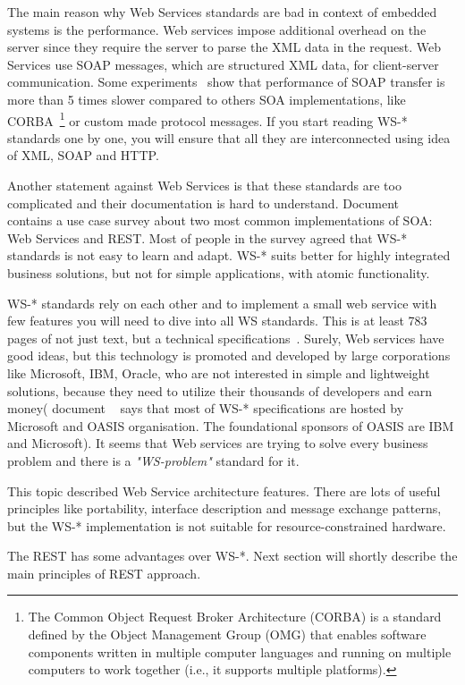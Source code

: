 The main reason why Web Services standards are bad in context of embedded
systems is the performance.
Web services impose additional overhead on the server since they require the
server to parse the \gls{XML} data in the request. Web Services use \gls{SOAP}
messages, which are structured \gls{XML} data, for client-server communication.
Some experiments~\cite{1182978, 5470528} show that performance of SOAP transfer
is more than 5 times slower compared to others \gls{SOA} implementations, like
CORBA~\footnote{The Common Object Request Broker Architecture (CORBA) is a
standard defined by the Object Management Group (OMG) that enables software
components written in multiple computer languages and running on multiple
computers to work together (i.e., it supports multiple
platforms).\cite{wikipedia:CORBA}} or custom made protocol messages. If you
start reading WS-* standards one by one, you will ensure that all they are
interconnected using idea of \gls{XML}, \gls{SOAP} and \gls{HTTP}. 


Another statement against Web Services is that these standards are too
complicated and their documentation is hard to
understand. Document ~\cite{dguinard-rest-vs-ws} contains a use case survey
about two most common implementations of SOA: Web Services and \gls{REST}. Most of people
in the survey agreed that WS-* standards is not easy to learn and adapt. WS-*
suits better for highly integrated business solutions, but not for simple
applications, with atomic functionality.

WS-* standards rely on each other and to implement a small web service with
few features you will need to dive into all WS standards. This is at least 783
pages of not just text, but a technical specifications~\cite{ws_pagecount}.
Surely, Web services have good ideas, but this technology is promoted and
developed by large corporations like Microsoft, IBM, Oracle, who are not
interested in simple and lightweight solutions, because they need to utilize
their thousands of developers and earn money( document ~\cite{ws_pagecount} says
that most of WS-* specifications are hosted by Microsoft and  OASIS
organisation. The foundational sponsors of OASIS are IBM and Microsoft).
It seems that Web services are trying to solve every business problem and there
is a \textit{"WS-problem"} standard for it.


This topic described Web Service architecture features. There are lots of
useful principles like portability, interface description and message exchange
patterns, but the WS-* implementation is not suitable for resource-constrained
hardware.


The \gls{REST} has some advantages over WS-*. Next section will shortly
describe the main principles of \gls{REST} approach. 





